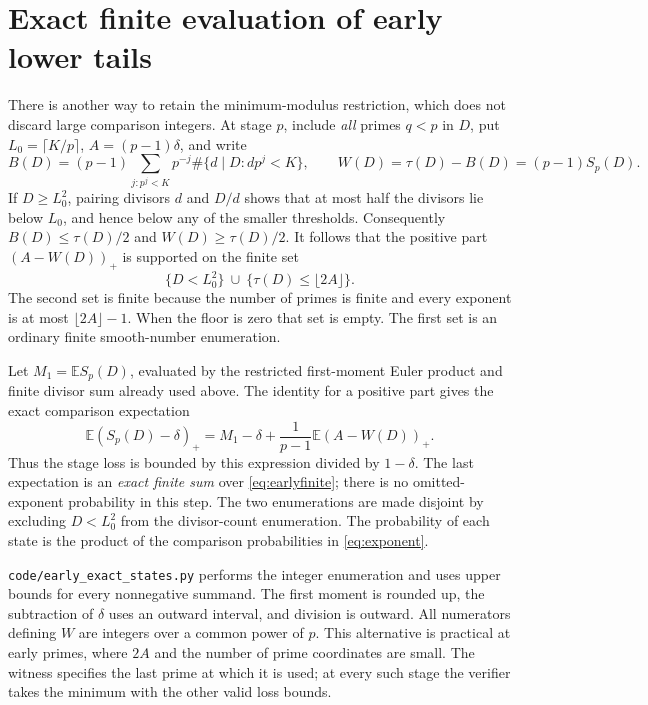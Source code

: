 \documentclass[11pt]{article}
\newcommand{\E}{\mathbb E}
\begin{document}
\section{Exact finite evaluation of early lower tails}\label{sec:earlyexact}
There is another way to retain the minimum-modulus restriction, which does
not discard large comparison integers. At stage $p$, include \emph{all}
primes $q<p$ in $D$, put $L_0=\lceil K/p\rceil$, $A=(p-1)\delta$, and write
\[
 B(D)=(p-1)\sum_{j:p^j<K}p^{-j}\#\{d\mid D:dp^j<K\},\qquad
 W(D)=\tau(D)-B(D)=(p-1)S_p(D).
\]
If $D\geq L_0^2$, pairing divisors $d$ and $D/d$ shows that at most half
the divisors lie below $L_0$, and hence below any of the smaller thresholds.
Consequently $B(D)\leq\tau(D)/2$ and $W(D)\geq\tau(D)/2$.
It follows that the positive part $(A-W(D))_+$ is supported on the finite set
\begin{equation}\label{eq:earlyfinite}
 \{D<L_0^2\}\ \cup\ \{\tau(D)\leq\lfloor2A\rfloor\}.
\end{equation}
The second set is finite because the number of primes is finite and every
exponent is at most $\lfloor2A\rfloor-1$. When the floor is zero that set
is empty. The first set is an ordinary finite smooth-number enumeration.

Let $M_1=\E S_p(D)$, evaluated by the restricted first-moment Euler product
and finite divisor sum already used above. The identity for a positive part
gives the exact comparison expectation
\[
 \E(S_p(D)-\delta)_+
 =M_1-\delta+\frac1{p-1}\E(A-W(D))_+.
\]
Thus the stage loss is bounded by this expression divided by $1-\delta$.
The last expectation is an \emph{exact finite sum} over
\eqref{eq:earlyfinite}; there is no omitted-exponent probability in this step.
The two enumerations are made disjoint by excluding $D<L_0^2$ from the
divisor-count enumeration. The probability of each state is the product
of the comparison probabilities in \eqref{eq:exponent}.

\texttt{code/early\_exact\_states.py} performs the integer enumeration and
uses upper bounds for every nonnegative summand. The first moment is rounded
up, the subtraction of $\delta$ uses an outward interval, and division is
outward. All numerators defining $W$ are integers over a common power of $p$.
This alternative is practical at early primes, where $2A$ and the number of
prime coordinates are small. The witness specifies the last prime at which
it is used; at every such stage the verifier takes the minimum with the
other valid loss bounds.
\end{document}
